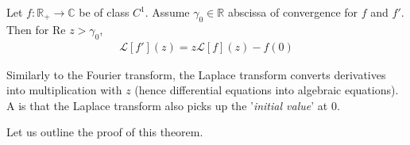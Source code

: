 \begin{theoreme}
Let $f : \mathbb{R}_+ \to \mathbb{C}$ be of class $C^{1}$. Assume $\gamma_0 \in \mathbb{R}$ abscissa of convergence for $f$ and $f'$. Then for $\text{Re }z > \gamma_0$, 
\begin{align*} 
	\mathcal{L}\left[f'\right]\left(z\right) = z \mathcal{L}\left[f\right]\left(z\right) - f\left(0\right)
\end{align*}
\end{theoreme}
\begin{framedremark}
Similarly to the Fourier transform, the Laplace transform converts derivatives into multiplication with $z$ (hence differential equations into algebraic equations). A  is that the Laplace transform also picks up the '\textit{initial value}' at $0$.
\end{framedremark}

Let us outline the proof of this theorem. 

